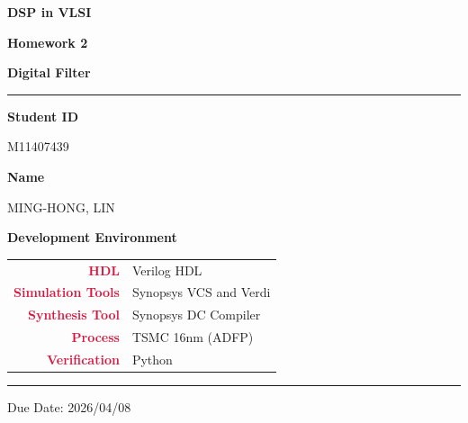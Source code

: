 \documentclass[12pt,a4paper]{report}
\let\oldtextbf\textbf
\renewcommand{\textbf}[1]{\oldtextbf{\textcolor{crimson}{#1}}}
\begin{document}
\pagestyle{plain}

\begin{titlepage}
\centering
\vspace*{3cm}

{\fontsize{28}{34}\selectfont\bfseries DSP in VLSI\par}
\vspace{0.6em}
{\fontsize{20}{26}\selectfont\bfseries Homework 2\par}
\vspace{0.4em}
{\fontsize{16}{22}\selectfont\bfseries Digital Filter\par}

\vspace{1.5cm}
\textcolor{crimson}{\rule{0.6\linewidth}{1.2pt}}
\vspace{1.5cm}

{\large\bfseries Student ID}\par
\vspace{0.4em}
{\large M11407439}\par

\vspace{0.8em}

{\large\bfseries Name}\par
\vspace{0.4em}
{\large MING-HONG, LIN}\par

\vspace{2cm}

{\large\bfseries Development Environment}\par
\vspace{0.8em}
\begin{tabular}{rl}
    \textbf{HDL}              & Verilog HDL \\[4pt]
    \textbf{Simulation Tools} & Synopsys VCS and Verdi \\[4pt]
    \textbf{Synthesis Tool}   & Synopsys DC Compiler \\[4pt]
    \textbf{Process}          & TSMC 16nm (ADFP) \\[4pt]
    \textbf{Verification}     & Python \\
\end{tabular}

\vfill

\textcolor{crimson}{\rule{0.6\linewidth}{0.6pt}}\par
\vspace{0.5em}
{\small Due Date: 2026/04/08}

\end{titlepage}
\end{document}
